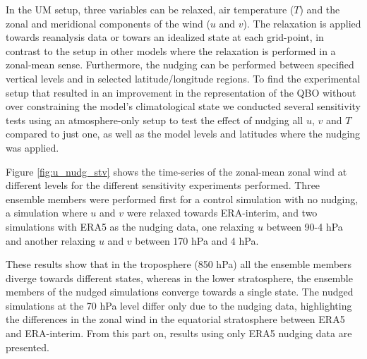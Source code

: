 In the UM setup, three variables can be relaxed, air temperature ($T$) and the zonal and meridional components of the wind ($u$ and $v$). The relaxation is applied towards reanalysis data or towars an idealized state at each grid-point, in contrast to the setup in other models \citep[e.g.][]{martin2021} where the relaxation is performed in a zonal-mean sense.
 Furthermore, the nudging can be performed between specified vertical levels and in selected latitude/longitude regions. %
 To find the experimental setup that resulted in an improvement in the representation of the QBO without over constraining the model's climatological state we conducted several sensitivity tests using an atmosphere-only setup to test the effect of nudging all $u$, $v$ and $T$ compared to just one, as well as the model levels and latitudes where the nudging was applied. 


Figure \ref{fig:u_nudg_stv} shows the time-series of the zonal-mean zonal wind at different levels for the different sensitivity experiments performed. Three ensemble members were performed first for a control simulation with no nudging, a simulation where $u$ and $v$ were relaxed towards ERA-interim, and two simulations with ERA5 as the nudging data, one relaxing $u$ between 90-4 hPa and another relaxing $u$ and $v$ between 170 hPa and 4 hPa.


These results show that in the troposphere (850 hPa) all the ensemble members diverge towards different states, whereas in the lower stratosphere, the ensemble members of the nudged simulations converge towards a single state. The nudged simulations at the 70 hPa level differ only due to the nudging data, highlighting the differences in the zonal wind in the equatorial stratosphere between ERA5 and ERA-interim. 
From this part on, results using only ERA5 nudging data are presented. 

